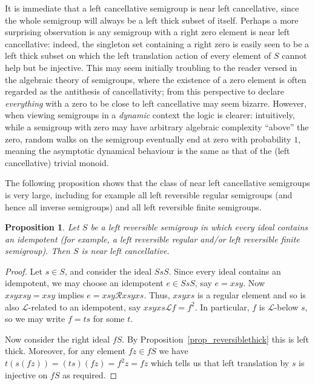 \documentclass[11pt,a4paper,reqno]{amsart}
\newtheorem{proposition}[theorem]{Proposition}
\begin{document}
It is immediate that a left cancellative semigroup is near
left cancellative, since the whole semigroup will always be a
left thick subset of itself.
Perhaps a more surprising observation is any semigroup with a
right zero element is near left
cancellative: indeed, the singleton set containing a right zero
is easily seen to be a left thick subset on which the left translation
action of every element of $S$ cannot help but be injective.
This may seem initially troubling to the reader versed in the algebraic
theory of semigroups, where the existence of a zero element is often 
regarded as the antithesis of cancellativity; from this perspective to declare
\textit{everything} with a zero to be close to left cancellative
may seem bizarre. However, when viewing semigroups in a 
\textit{dynamic} context the logic is clearer: intuitively, while a
semigroup with zero may have arbitrary 
algebraic complexity ``above'' the zero, random walks on the semigroup
eventually end at zero with probability $1$, meaning the asymptotic
dynamical behaviour is the same as that of the (left cancellative)
trivial monoid.

The following proposition shows that the class of near left cancellative
semigroups is very large, including for example all left reversible regular
semigroups (and hence all inverse semigroups) and all left reversible
finite semigroups.

\begin{proposition}\label{prop_idptsalc}
Let $S$ be a left reversible semigroup in which every ideal contains an
idempotent (for example, a left reversible regular and/or left reversible
finite semigroup). Then $S$ is near left cancellative.
\end{proposition}
\begin{proof}
Let $s \in S$, and consider the ideal $SsS$. Since every ideal contains
an idempotent, we may choose an idempotent $e \in SsS$, say $e = xsy$.
Now $xsyxsy = xsy$ implies $e = xsy {\mathcal{R}} xsyxs$. Thus, $xsyxs$ is
a regular element and so is also ${\mathcal{L}}$-related to an idempotent, say
$xsyxs {\mathcal{L}} f = f^2$. In particular, $f$ is ${\mathcal{L}}$-below $s$, so
we may write $f = ts$ for some $t$.

Now consider the right ideal $fS$. By Proposition~\ref{prop_reversiblethick}
this is left thick. Moreover,
for any element $fz \in fS$ we have $t(s(fz)) = (ts)(fz) = f^2 z = fz$
which tells us that left translation by $s$ is injective on $fS$
as required.
\end{proof}
\end{document}
